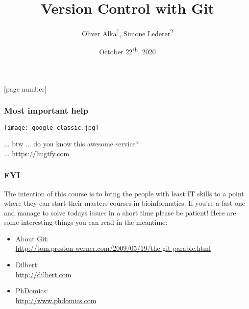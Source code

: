 \documentclass{beamer} %
\begin{document}
\author{Oliver Alka\textsuperscript{1}, Simone Lederer\textsuperscript{2}}
\title[Git]{Version Control with Git}
\date{October 22\textsuperscript{th}, 2020}
[page number]{}

\maketitle

\begin{frame}
\frametitle{Most important help}
\begin{center}

	\texttt{[image: google\_classic.jpg]}

	... btw ...  do you know this awesome service? \\
	... \url{https://lmgtfy.com}

\end{center}
\end{frame}

\begin{frame}
\frametitle{FYI}

The intention of this course is to bring the people with least IT skills to a point where
they can start their masters courses in bioinformatics. If you're a fast one and manage to
solve todays issues in a short time please be patient! Here are some interesting things you
can read in the meantime:

\begin{itemize}
    \setlength\itemsep{1em}
	\item About Git: \\ \url{http://tom.preston-werner.com/2009/05/19/the-git-parable.html}
    \item Dilbert: \\ \url{http://dilbert.com}
    \item PhDomics: \\ \url{http://www.phdomics.com}
\end{itemize}
\end{frame}
\end{document}
